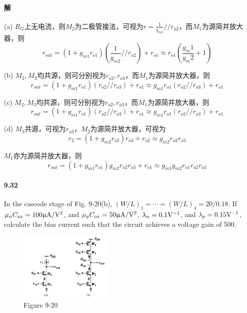 \documentclass[hyperref, UTF8]{ctexart}
\newcommand{\under}[1]{\frac{1}{#1}}
\newcommand{\volt}{{\rm V}}
\newcommand{\microampere}{{\rm \upmu A}}
\begin{document}
\paragraph{解}

    (a) $R_G$上无电流，则$M_2$为二极管接法，可视为$r=\under{g_{m2}}//r_{o2}$，而$M_1$为源简并放大器，则
    $$r_{out}=(1+g_{m1}r_{o1})(\under{g_{m2}}//r_{o2})+r_{o1} \approx r_{o1}(\frac{g_m1}{g_m2}+1)$$

    (b) $M_2,M_3$均共源，则可分别视为$r_{o2},r_{o3}$，而$M_1$为源简并放大器，则
    $$r_{out}=(1+g_{m1}r_{o1})(r_{o2}//r_{o3})+r_{o1} \approx g_{m1}r_{o1}(r_{o2}//r_{o3})+r_{o1}$$

    (c) $M_2,M_3$均共源，则可分别视为$r_{o2},r_{o3}$，而$M_1$为源简并放大器，则
    $$r_{out}=(1+g_{m1}r_{o1})(r_{o2}//r_{o3})+r_{o1} \approx g_{m1}r_{o1}(r_{o2}//r_{o3})+r_{o1}$$

    (d) $M_3$共源，可视为$r_{o3}$，$M_2$为源简并放大器，可视为
    $$r_2 = (1+g_{m2}r_{o2})r_{o3}+r_{o2} \approx g_{m2}r_{o2}r_{o3}$$

    $M_1$亦为源简并放大器，则
    $$r_{out}=(1+g_{m1}r_{o1})g_{m2}r_{o2}r_{o3}+r_{o1} \approx g_{m1}g_{m2}r_{o1}r_{o2}r_{o3}$$
    
\paragraph{9.32} \label{9.32}
    In the cascode stage of Fig. 9-20(b), $(W/L)_1=\cdots=(W/L)_4 = 20/0.18$. If $\mu_nC_{ox}=100\microampere/\volt^2$, and $\mu_pC_{ox}=50\microampere/\volt^2$, $\lambda_n = 0.1 \volt^{-1}$, and $\lambda_p=0.15\volt^{-1}$, calculate the bias current such that the circuit achieves a voltage gain of 500.

    \begin{figure}[!htb]
        \centering
        \includegraphics[width=0.411\textwidth]{p9-20.png}
        \caption*{Figure 9-20}
    \end{figure}
\end{document}
